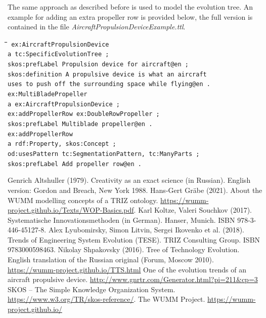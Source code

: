 \documentclass[11pt,a4paper]{article}
\newenvironment{code}{\tt \begin{tabbing}
\hskip12pt\=\hskip12pt\=\hskip12pt\=\hskip12pt\=\hskip5cm\=\hskip5cm\=\kill}
{\end{tabbing}}
\def\dq{{\char34}}
\begin{document}
The same approach as described before is used to model the evolution tree. An
example for adding an extra propeller row is provided below, the full version
is contained in the file \textit{AircraftPropulsionDeviceExample.ttl}.

\begin{code}\tt
ex:AircraftPropulsionDevice \\
\> a tc:SpecificEvolutionTree ; \\
\> skos:prefLabel {\dq}Propulsion device for aircraft{\dq}@en ; \\
\> skos:definition {\dq}{\dq}{\dq}A propulsive device is what an aircraft \\
\>\> uses to push off the surrounding space while flying{\dq}{\dq}{\dq}@en
.\\[4pt] 
ex:MultiBladePropeller \\
\> a ex:AircraftPropulsionDevice ; \\
\> ex:addPropellerRow ex:DoubleRowPropeller ; \\
\> skos:prefLabel {\dq}Multiblade propeller{\dq}@en .\\[4pt]
ex:addPropellerRow \\
\> a rdf:Property, skos:Concept ; \\
\> od:usesPattern tc:SegmentationPattern, tc:ManyParts ; \\
\> skos:prefLabel {\dq}Add propeller row{\dq}@en .
\end{code}

\begin{thebibliography}{xxx}
\raggedright
{} Genrich Altshuller (1979).  Creativity as an exact
  science (in Russian). English version: Gordon and Breach, New York 1988.
 Hans-Gert Gr\"abe (2021). About the WUMM modelling
  concepts of a TRIZ ontology.
  \url{https://wumm-project.github.io/Texts/WOP-Basics.pdf}.
 Karl Koltze, Valeri Souchkov (2017).  Systematische
  Innovationsmethoden (in German).  Hanser, Munich. ISBN 978-3-446-45127-8.
 Alex Lyubomirsky, Simon Litvin, Sergei Ikovenko et al.
  (2018). Trends of Engineering System Evolution (TESE).  TRIZ Consulting
  Group. ISBN 9783000598463.
 Nikolay Shpakovsky (2016). Tree of Technology
  Evolution. English translation of the Russian original (Forum, Moscow
  2010).\\ \url{https://wumm-project.github.io/TTS.html}
 One of the evolution trends of an aircraft propulsive device. \url{http://www.gnrtr.com/Generator.html?pi=211&cp=3}
 SKOS -- The Simple Knowledge Organization System.
  \url{https://www.w3.org/TR/skos-reference/}.  
 The WUMM Project. \url{https://wumm-project.github.io/} 
\end{thebibliography}
\end{document}
